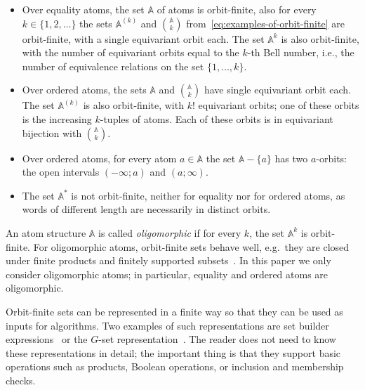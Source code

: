 \documentclass[10pt,a4paper]{amsart}
\numberwithin{equation}{section}
\newcommand{\set}[1]{\{#1\}}
\newcommand{\atoms}{\mathbb A}
\begin{document}
\begin{example}\label{ex:sets-with-atoms}
\begin{itemize}
\item Over equality atoms, the set $\atoms$ of atoms is orbit-finite, also for every $k \in \set{1,2,\ldots}$ the sets $\atoms^{(k)}$ and $\atoms\choose k$ from~\eqref{eq:examples-of-orbit-finite} are orbit-finite, with a single equivariant orbit each. The set $\atoms^k$ is also orbit-finite, with the number of equivariant orbits equal to the $k$-th Bell number, i.e., the number of equivalence relations on the set $\{1,\ldots,k\}$.
\item Over ordered atoms, the sets $\atoms$ and $\atoms\choose k$ have single equivariant orbit each. The set $\atoms^{(k)}$ is also orbit-finite, with $k!$ equivariant orbits; one of these orbits is the  increasing $k$-tuples of atoms. Each of these orbits is in equivariant bijection with $\atoms\choose k$.
\item Over ordered atoms, for every atom $a \in \atoms$ the set $\atoms - \set{a}$ has two $a$-orbits: the open intervals $(-\infty;a)$  and $(a;\infty)$.
\item The set $\atoms^*$ is not orbit-finite, neither for equality nor for ordered atoms, as words of different length are necessarily in distinct orbits.
\end{itemize}
\end{example}

An atom structure $\atoms$ is called \emph{oligomorphic} if for every $k$, the set $\atoms^k$ is orbit-finite. For oligomorphic atoms, orbit-finite sets behave well, e.g.~they are closed under finite products and finitely supported subsets~\cite[Lem.~3.24]{bojanczyk_slightly2018}. In this paper we only consider oligomorphic atoms; in particular, equality and ordered atoms are oligomorphic.

Orbit-finite sets can be represented in a finite way so that they can be used as inputs for algorithms. Two examples of such representations are set builder expressions~\cite[Sec.~4.1]{bojanczyk_slightly2018} or the $G$-set representation~\cite[Sec.~8]{BKL14}. The reader does not need to know these representations in detail; the important thing is that they support basic operations such as products, Boolean operations, or inclusion and membership checks.  
\end{document}
